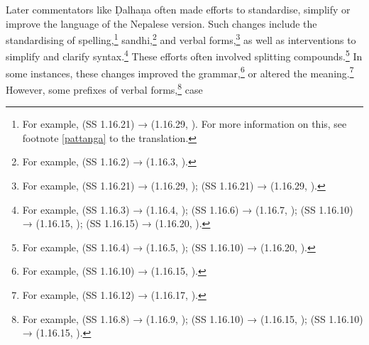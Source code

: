 Later commentators like Ḍalhaṇa often made efforts to standardise, simplify or
improve the language of the Nepalese version. Such changes include the
standardising of spelling,\footnote{For example,  (SS 1.16.21) →
     (1.16.29, \cite[81]{vulgate}). For more information on this, see
    footnote \ref{pattanga} to the translation.} sandhi,\footnote{For example,
         (SS 1.16.2) →  (1.16.3, \cite[76]{vulgate}).}
        and verbal forms,\footnote{For example,  (SS 1.16.21) →
             (1.16.29, \cite[81]{vulgate});  (SS 1.16.21) 
            →
             (1.16.29, \cite[81]{vulgate}).} as well as interventions to
            simplify and clarify syntax.\footnote{For example, 
                (SS 1.16.3) →
                 (1.16.4, \cite[76]{vulgate}); 
                (SS 1.16.6) →  (1.16.7, \cite[77]{vulgate});
                 (SS 1.16.10) →  (1.16.15,
                \cite[78]{vulgate});  (SS 1.16.15) →  (1.16.20,
                \cite[79]{vulgate}).} These efforts often involved splitting
                compounds.\footnote{For example,  
                (SS 1.16.4) →
                     (1.16.5, \cite[76]{vulgate});
                     (SS 1.16.10) →  (1.16.20,
                    \cite[78]{vulgate}).} In some instances, these changes improved the
                    grammar,\footnote{For example,  (SS 1.16.10) →
                         (1.16.15, \cite[78]{vulgate}).} or altered the
                        meaning.\footnote{For example,  (SS 1.16.12) →
                             (1.16.17, \cite[79]{vulgate}).} However, some 
                            prefixes of
                            verbal forms,\footnote{For example,  (SS 1.16.8) 
                            →
                                 (1.16.9, \cite[77]{vulgate});  
                                (SS 1.16.10) →
                                 (1.16.15, \cite[78]{vulgate});  
                                (SS 1.16.10) →
                                 (1.16.15, \cite[78]{vulgate}).} case 
